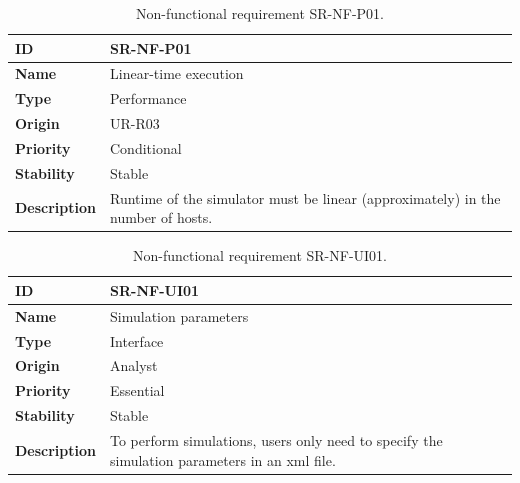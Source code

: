 \begin{center}
\begin{table}[htbp]
\centering
\begin{tabular}{@{}p{2.5cm} p{9cm}@{}} 
\toprule
\textbf{ID} 				& SR-NF-P01\\
\midrule
\textbf{Name} 			& Linear-time execution \\
\midrule
\textbf{Type} 			& Performance \\
\midrule
\textbf{Origin} 			& UR-R03 \\
\midrule
\textbf{Priority}		& Conditional \\
\midrule
\textbf{Stability} 		& Stable \\
\midrule
\textbf{Description} 	& Runtime of the simulator must be linear (approximately) in the number of hosts. \\
\bottomrule
\end{tabular}
\caption{Non-functional requirement SR-NF-P01.}
\label{tab:srnfp01}
\end{table}
\end{center}

\begin{center}
\begin{table}[htbp]
\centering
\begin{tabular}{@{}p{2.5cm} p{9cm}@{}} 
\toprule
\textbf{ID} 				& SR-NF-UI01\\
\midrule
\textbf{Name} 			& Simulation parameters \\
\midrule
\textbf{Type} 			& Interface \\
\midrule
\textbf{Origin} 			& Analyst \\
\midrule
\textbf{Priority}		& Essential \\
\midrule
\textbf{Stability} 		& Stable \\
\midrule
\textbf{Description} 	& To perform simulations, users only need to specify the simulation parameters in an \gls{xml} file. \\
\bottomrule
\end{tabular}
\caption{Non-functional requirement SR-NF-UI01.}
\label{tab:srnfui01}
\end{table}
\end{center}


